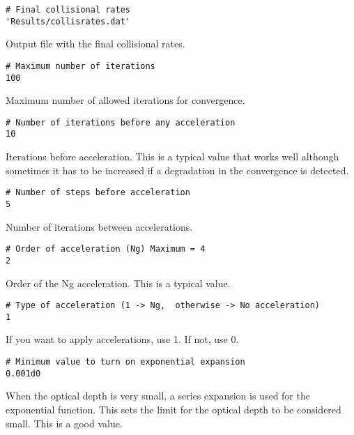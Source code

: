 \documentclass[12pt]{article}
\begin{document}
\begin{footnotesize} \begin{verbatim}
# Final collisional rates
'Results/collisrates.dat'
\end{verbatim} \end{footnotesize}
Output file with the final collisional rates.

\begin{footnotesize} \begin{verbatim}
# Maximum number of iterations
100
\end{verbatim} \end{footnotesize}
Maximum number of allowed iterations for convergence.

\begin{footnotesize} \begin{verbatim}
# Number of iterations before any acceleration
10
\end{verbatim} \end{footnotesize}
Iterations before acceleration. This is a typical value that works well
although sometimes it has to be increased if a degradation in the
convergence is detected.

\begin{footnotesize} \begin{verbatim}
# Number of steps before acceleration
5
\end{verbatim} \end{footnotesize}
Number of iterations between accelerations.

\begin{footnotesize} \begin{verbatim}
# Order of acceleration (Ng) Maximum = 4
2
\end{verbatim} \end{footnotesize}
Order of the Ng acceleration. This is a typical value.

\begin{footnotesize} \begin{verbatim}
# Type of acceleration (1 -> Ng,  otherwise -> No acceleration)
1
\end{verbatim} \end{footnotesize}
If you want to apply accelerations, use 1. If not, use 0.

\begin{footnotesize} \begin{verbatim}
# Minimum value to turn on exponential expansion
0.001d0
\end{verbatim} \end{footnotesize}
When the optical depth is very small, a series expansion is used for the
exponential function. This sets the limit for the optical depth to be considered small.
This is a good value.
\end{document}
